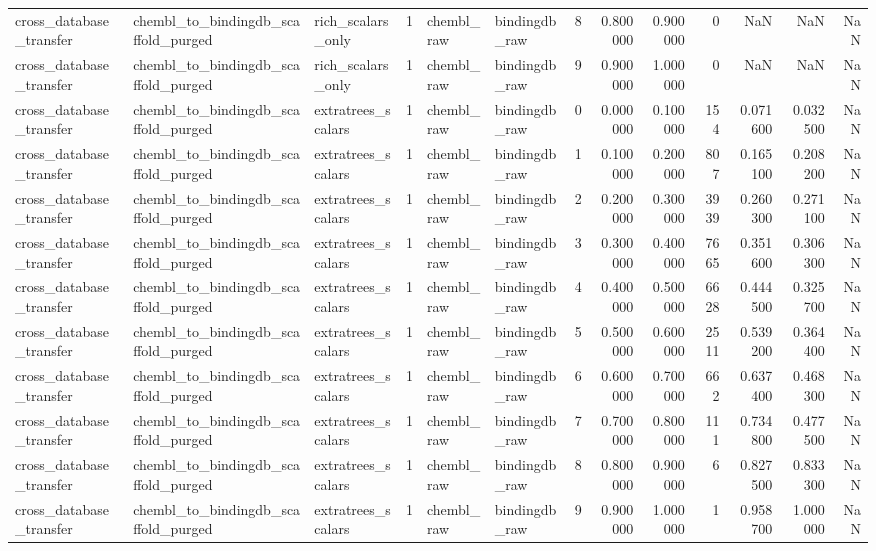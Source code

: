 \begin{longtable}{lllrllrrrrrrr}
cross\_database\_transfer & chembl\_to\_bindingdb\_scaffold\_purged & rich\_scalars\_only & 1 & chembl\_raw & bindingdb\_raw & 8 & 0.800000 & 0.900000 & 0 & NaN & NaN & NaN \\
cross\_database\_transfer & chembl\_to\_bindingdb\_scaffold\_purged & rich\_scalars\_only & 1 & chembl\_raw & bindingdb\_raw & 9 & 0.900000 & 1.000000 & 0 & NaN & NaN & NaN \\
cross\_database\_transfer & chembl\_to\_bindingdb\_scaffold\_purged & extratrees\_scalars & 1 & chembl\_raw & bindingdb\_raw & 0 & 0.000000 & 0.100000 & 154 & 0.071600 & 0.032500 & NaN \\
cross\_database\_transfer & chembl\_to\_bindingdb\_scaffold\_purged & extratrees\_scalars & 1 & chembl\_raw & bindingdb\_raw & 1 & 0.100000 & 0.200000 & 807 & 0.165100 & 0.208200 & NaN \\
cross\_database\_transfer & chembl\_to\_bindingdb\_scaffold\_purged & extratrees\_scalars & 1 & chembl\_raw & bindingdb\_raw & 2 & 0.200000 & 0.300000 & 3939 & 0.260300 & 0.271100 & NaN \\
cross\_database\_transfer & chembl\_to\_bindingdb\_scaffold\_purged & extratrees\_scalars & 1 & chembl\_raw & bindingdb\_raw & 3 & 0.300000 & 0.400000 & 7665 & 0.351600 & 0.306300 & NaN \\
cross\_database\_transfer & chembl\_to\_bindingdb\_scaffold\_purged & extratrees\_scalars & 1 & chembl\_raw & bindingdb\_raw & 4 & 0.400000 & 0.500000 & 6628 & 0.444500 & 0.325700 & NaN \\
cross\_database\_transfer & chembl\_to\_bindingdb\_scaffold\_purged & extratrees\_scalars & 1 & chembl\_raw & bindingdb\_raw & 5 & 0.500000 & 0.600000 & 2511 & 0.539200 & 0.364400 & NaN \\
cross\_database\_transfer & chembl\_to\_bindingdb\_scaffold\_purged & extratrees\_scalars & 1 & chembl\_raw & bindingdb\_raw & 6 & 0.600000 & 0.700000 & 662 & 0.637400 & 0.468300 & NaN \\
cross\_database\_transfer & chembl\_to\_bindingdb\_scaffold\_purged & extratrees\_scalars & 1 & chembl\_raw & bindingdb\_raw & 7 & 0.700000 & 0.800000 & 111 & 0.734800 & 0.477500 & NaN \\
cross\_database\_transfer & chembl\_to\_bindingdb\_scaffold\_purged & extratrees\_scalars & 1 & chembl\_raw & bindingdb\_raw & 8 & 0.800000 & 0.900000 & 6 & 0.827500 & 0.833300 & NaN \\
cross\_database\_transfer & chembl\_to\_bindingdb\_scaffold\_purged & extratrees\_scalars & 1 & chembl\_raw & bindingdb\_raw & 9 & 0.900000 & 1.000000 & 1 & 0.958700 & 1.000000 & NaN \\

\end{longtable}
